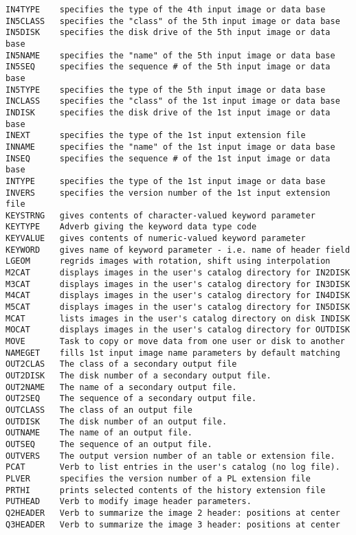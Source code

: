 \begin{verbatim}
IN4TYPE    specifies the type of the 4th input image or data base
IN5CLASS   specifies the "class" of the 5th input image or data base
IN5DISK    specifies the disk drive of the 5th input image or data base
IN5NAME    specifies the "name" of the 5th input image or data base
IN5SEQ     specifies the sequence # of the 5th input image or data base
IN5TYPE    specifies the type of the 5th input image or data base
INCLASS    specifies the "class" of the 1st input image or data base
INDISK     specifies the disk drive of the 1st input image or data base
INEXT      specifies the type of the 1st input extension file
INNAME     specifies the "name" of the 1st input image or data base
INSEQ      specifies the sequence # of the 1st input image or data base
INTYPE     specifies the type of the 1st input image or data base
INVERS     specifies the version number of the 1st input extension file
KEYSTRNG   gives contents of character-valued keyword parameter
KEYTYPE    Adverb giving the keyword data type code
KEYVALUE   gives contents of numeric-valued keyword parameter
KEYWORD    gives name of keyword parameter - i.e. name of header field
LGEOM      regrids images with rotation, shift using interpolation
M2CAT      displays images in the user's catalog directory for IN2DISK
M3CAT      displays images in the user's catalog directory for IN3DISK
M4CAT      displays images in the user's catalog directory for IN4DISK
M5CAT      displays images in the user's catalog directory for IN5DISK
MCAT       lists images in the user's catalog directory on disk INDISK
MOCAT      displays images in the user's catalog directory for OUTDISK
MOVE       Task to copy or move data from one user or disk to another
NAMEGET    fills 1st input image name parameters by default matching
OUT2CLAS   The class of a secondary output file
OUT2DISK   The disk number of a secondary output file.
OUT2NAME   The name of a secondary output file.
OUT2SEQ    The sequence of a secondary output file.
OUTCLASS   The class of an output file
OUTDISK    The disk number of an output file.
OUTNAME    The name of an output file.
OUTSEQ     The sequence of an output file.
OUTVERS    The output version number of an table or extension file.
PCAT       Verb to list entries in the user's catalog (no log file).
PLVER      specifies the version number of a PL extension file
PRTHI      prints selected contents of the history extension file
PUTHEAD    Verb to modify image header parameters.
Q2HEADER   Verb to summarize the image 2 header: positions at center
Q3HEADER   Verb to summarize the image 3 header: positions at center

\end{verbatim}
